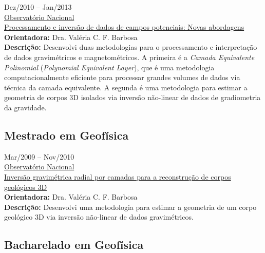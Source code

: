 \faHourglassStart \quad Dez/2010 -- Jan/2013\\
\faInstitution \quad \href{http://www.on.br/index.php/pt-br/}{Observat{\'o}rio Nacional}\\
\faExternalLink \quad  \href{http://www.pinga-lab.org/thesis/oliveira-jr-phd.html}{Processamento e invers\~{a}o de dados de campos potenciais: Novas abordagens}\\
\textbf{Orientadora:} Dra. Valéria C. F. Barbosa \\
\textbf{Descrição:} Desenvolvi duas metodologias para o 
processamento e interpretação de dados gravimétricos e magnetométricos. A primeira é
a \textit{Camada Equivalente Polinomial} (\textit{Polynomial Equivalent Layer}), que 
é uma metodologia computacionalmente eficiente para processar grandes volumes de dados 
via técnica da camada equivalente. A segunda é uma metodologia para estimar a geometria 
de corpos 3D isolados via inversão não-linear de dados de gradiometria da gravidade.\\


\subsection*{Mestrado em Geof{\'i}sica}

\faHourglassStart \quad Mar/2009 -- Nov/2010\\
\faInstitution \quad \href{http://www.on.br/index.php/pt-br/}{Observat{\'o}rio Nacional}\\
\faExternalLink \quad  \href{http://www.pinga-lab.org/thesis/oliveira-jr-msc.html}{Invers{\~a}o gravim{\'e}trica radial por camadas para a reconstru{\c c}{\~a}o de corpos geol{\'o}gicos 3D}\\
\textbf{Orientadora:} Dra. Valéria C. F. Barbosa \\
\textbf{Descrição:} Desenvolvi uma metodologia para
estimar a geometria de um corpo geol{\'o}gico 3D via invers{\~a}o n{\~a}o-linear 
de dados gravimétricos.\\


\subsection*{Bacharelado em Geof{\'i}sica}

